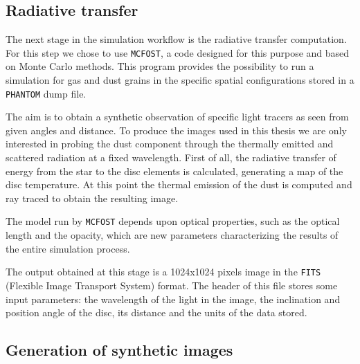 \documentclass[a4paper,10pt]{report}
\begin{document}
\subsection{Radiative transfer}

The next stage in the simulation workflow is the radiative transfer computation. For this
step we chose to use \lstinline{MCFOST}, a code designed for this purpose and based on Monte Carlo methods.
This program provides the possibility to run a simulation for gas and dust grains in the specific 
spatial configurations stored in a \lstinline{PHANTOM} dump file.

The aim is to obtain a synthetic observation of specific light tracers as seen from given angles and distance.
To produce the images used in this thesis we are only interested in probing the dust component through the thermally
emitted and scattered radiation at a fixed wavelength.
First of all, the radiative transfer of energy from the star to the disc elements is calculated, generating a map of the disc temperature.
At this point the thermal emission of the dust is computed and ray traced to obtain the resulting image.

The model run by \lstinline{MCFOST} depends upon optical properties, such as the optical length and the opacity, which 
are new parameters characterizing the results of the entire simulation process.

The output obtained at this stage is a 1024x1024 pixels image in the
\lstinline{FITS} (Flexible Image Transport System) format.
The header of this file stores some input parameters: 
the wavelength of the light in the image, the inclination and position angle of
the disc, its distance and the units of the data stored.

\subsection{Generation of synthetic images}

\end{document}
